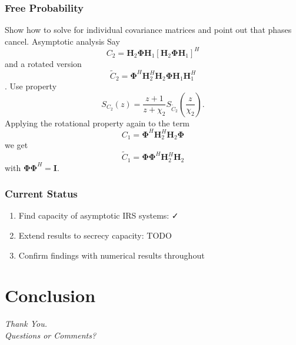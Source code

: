 \documentclass[10pt,tgadventor, onlymath]{beamer}
\begin{document}
\begin{frame}
\frametitle{Free Probability}
Show how to solve for individual covariance matrices and point out that phases cancel.
Asymptotic analysis
Say 
\begin{equation}
C_2 = \mathbf{H}_{2}\boldsymbol{\Phi}\mathbf{H}_{1}[\mathbf{H}_{2}\boldsymbol{\Phi}\mathbf{H}_{1}]^H
\end{equation}
and a rotated version 
\begin{equation}
\tilde{C}_2 = \boldsymbol{\Phi}^H\mathbf{H}_{2}^H\mathbf{H}_{2}\boldsymbol{\Phi}\mathbf{H}_{1}\mathbf{H}_{1}^H
\end{equation}. 
Use property 
\begin{equation}\label{rotation_property}
S_{C_2}(z) = \frac{z+1}{z+\chi_2} S_{\tilde{C}_2}(\frac{z}{\chi_2}).
\end{equation}
Applying the rotational property again to the term 
\begin{equation}
C_{1} = \boldsymbol{\Phi}^H\mathbf{H}_{2}^H\mathbf{H}_{2}\boldsymbol{\Phi}
\end{equation}
we get 
\begin{equation}
\tilde{C}_{1} = \boldsymbol{\Phi}\boldsymbol{\Phi}^H\mathbf{H}_{2}^H\mathbf{H}_{2}
\end{equation}
with $\boldsymbol{\Phi}\boldsymbol{\Phi}^H = \mathbf{I}$.
\end{frame}


\begin{frame}
\frametitle{Current Status}
\begin{enumerate}
\item
	Find capacity of asymptotic IRS systems: \faCheck
\item
	Extend results to secrecy capacity: TODO
\item 
	Confirm findings with numerical results throughout
\end{enumerate}

\end{frame}


\section{Conclusion}

\begin{frame}
  \centering \Large
  \emph{Thank You.}
  \\
	\bigskip
    \centering \Large
  \emph{Questions or Comments?}

\end{frame}
\end{document}
